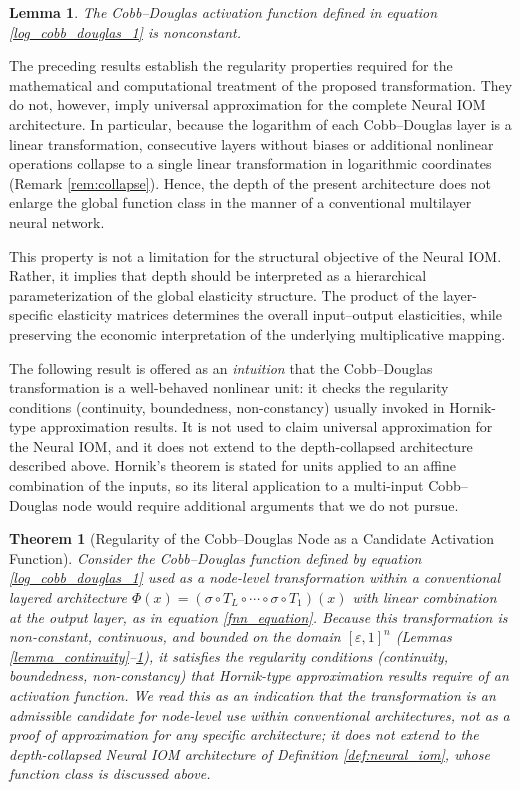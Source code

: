\documentclass[preprint,12pt,authoryear]{sn-jnl}
\newtheorem{lemma}{Lemma}
\newtheorem{theorem}{Theorem}
\begin{document}
\begin{lemma} \label{lemma_nonconstant}
The Cobb--Douglas activation function defined in equation \ref{log_cobb_douglas_1} is nonconstant.
\end{lemma}

The preceding results establish the regularity properties required for the mathematical and computational treatment of the proposed transformation. They do not, however, imply universal approximation for the complete Neural IOM architecture. In particular, because the logarithm of each Cobb--Douglas layer is a linear transformation, consecutive layers without biases or additional nonlinear operations collapse to a single linear transformation in logarithmic coordinates (Remark \ref{rem:collapse}). Hence, the depth of the present architecture does not enlarge the global function class in the manner of a conventional multilayer neural network.

This property is not a limitation for the structural objective of the Neural IOM. Rather, it implies that depth should be interpreted as a hierarchical parameterization of the global elasticity structure. The product of the layer-specific elasticity matrices determines the overall input--output elasticities, while preserving the economic interpretation of the underlying multiplicative mapping.

The following result is offered as an \emph{intuition} that the Cobb--Douglas transformation is a well-behaved nonlinear unit: it checks the regularity conditions (continuity, boundedness, non-constancy) usually invoked in Hornik-type approximation results. It is not used to claim universal approximation for the Neural IOM, and it does not extend to the depth-collapsed architecture described above. Hornik's theorem is stated for units applied to an affine combination of the inputs, so its literal application to a multi-input Cobb--Douglas node would require additional arguments that we do not pursue.

\begin{theorem}[Regularity of the Cobb--Douglas Node as a Candidate Activation Function] \label{theorem_1}
Consider the Cobb--Douglas function defined by equation \ref{log_cobb_douglas_1} used as a node-level transformation within a conventional layered architecture $\Phi(x) = (\sigma \circ T_L \circ \cdots \circ \sigma \circ T_1)(x)$ with linear combination at the output layer, as in equation \ref{fnn_equation}. Because this transformation is non-constant, continuous, and bounded on the domain $[\varepsilon,1]^n$ (Lemmas \ref{lemma_continuity}--\ref{lemma_nonconstant}), it satisfies the regularity conditions (continuity, boundedness, non-constancy) that Hornik-type approximation results require of an activation function. We read this as an indication that the transformation is an admissible candidate for node-level use within conventional architectures, not as a proof of approximation for any specific architecture; it does not extend to the depth-collapsed Neural IOM architecture of Definition \ref{def:neural_iom}, whose function class is discussed above.
\end{theorem}
\end{document}
